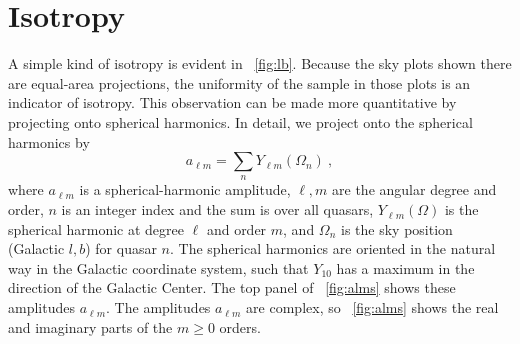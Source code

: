 \documentclass[modern]{aastex631}
\newcommand{\figref}[1]{\figurename~\ref{#1}}
\begin{document}
\section{Isotropy}

A simple kind of isotropy is evident in \figref{fig:lb}.
Because the sky plots shown there are equal-area projections, the uniformity of the sample in those plots is an indicator of isotropy.
This observation can be made more quantitative by projecting onto spherical harmonics.
In detail, we project onto the spherical harmonics by
\begin{equation}
    a_{\ell m} = \sum_n Y_{\ell m}(\Omega_n) ~,
\end{equation}
where $a_{\ell m}$ is a spherical-harmonic amplitude,
$\ell, m$ are the angular degree and order,
$n$ is an integer index and the sum is over all quasars,
$Y_{\ell m}(\Omega)$ is the spherical harmonic at degree $\ell$ and order $m$,
and
$\Omega_n$ is the sky position (Galactic $l, b$) for quasar $n$.
The spherical harmonics are oriented in the natural way in the Galactic coordinate system, such that $Y_{10}$ has a maximum in the direction of the Galactic Center.
The top panel of \figref{fig:alms} shows these amplitudes $a_{\ell m}$.
The amplitudes $a_{\ell m}$ are complex, so \figref{fig:alms} shows the real and imaginary parts of the $m\geq 0$ orders.
\end{document}
